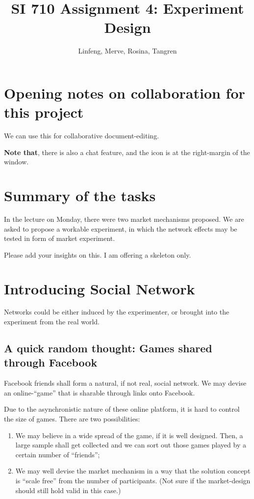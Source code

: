 \documentclass{article}
\title{SI 710 Assignment 4: Experiment Design}
\author{Linfeng, Merve, Rosina, Tangren}
\date{}
\begin{document}
\maketitle
\section{Opening notes on collaboration for this project}%

We can use this for collaborative document-editing.

\textbf{Note that}, there is also a chat feature, and the icon is at the right-margin of the window.

\section{Summary of the tasks}

In the lecture on Monday, there were two market mechanisms proposed. We are
asked to propose a workable experiment, in which the network effects may be
tested in form of market experiment.

Please add your insights on this. I am offering a skeleton only.

\section{Introducing Social Network}

Networks could be either induced by the experimenter, or brought into the
experiment from the real world.

\subsection{A quick random thought: Games shared through Facebook}

Facebook friends shall form a natural, if not real, social network. We
may devise an online-``game'' that is sharable through links onto Facebook.

Due to the asynchronistic nature of these online platform, it is hard to control
the size of games. There are two possibilities:
\begin{enumerate}
    \item We may believe in a wide spread of the game, if it is well designed.
        Then, a large sample shall get collected and we can sort out those games
        played by a certain number of ``friends'';
    \item We may well devise the market mechanism in a way that the solution
        concept is ``scale free'' from the number of participants. (Not sure if
        the market-design should still hold valid in this case.)
\end{enumerate}
\end{document}
